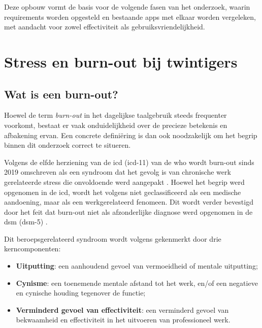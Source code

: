 \vspace{1em}

Deze opbouw vormt de basis voor de volgende fasen van het onderzoek, waarin requirements worden opgesteld en bestaande apps met elkaar worden vergeleken, met aandacht voor zowel effectiviteit als gebruiksvriendelijkheid.




\section{Stress en burn-out bij twintigers}
\label{sec:burnout-bij-twintigers}

\subsection{Wat is een burn-out?}
\label{subsec:wat-is-burnout}

\vspace{1em}

Hoewel de term \textit{burn-out} in het dagelijkse taalgebruik steeds frequenter voorkomt, bestaat er vaak onduidelijkheid over de precieze betekenis en afbakening ervan. Een concrete definiëring is dan ook noodzakelijk om het begrip binnen dit onderzoek correct te situeren.

\vspace{1em}

Volgens de elfde herziening van de \acrlong{icd} (\acrshort{icd}-11) van de \acrshort{who} wordt burn-out sinds 2019 omschreven als een syndroom dat het gevolg is van chronische werk gerelateerde stress die onvoldoende werd aangepakt \autocite{WHOW2019}. Hoewel het begrip werd opgenomen in de \acrshort{icd}, wordt het volgens \textcite{WHOW2019}niet geclassificeerd als een medische aandoening, maar als een werkgerelateerd fenomeen. Dit wordt verder bevestigd door het feit dat burn-out niet als afzonderlijke diagnose werd opgenomen in de \acrlong{dsm} (\acrshort{dsm}-5) \autocite{Association2013}.

\vspace{1em}

Dit beroepsgerelateerd syndroom wordt volgens \textcite{WHOW2019} gekenmerkt door drie kerncomponenten:
\begin{itemize}
    \item \textbf{Uitputting}: een aanhoudend gevoel van vermoeidheid of mentale uitputting;
    \item \textbf{Cynisme}: een toenemende mentale afstand tot het werk, en/of een negatieve en cynische houding tegenover de functie;
    \item \textbf{Verminderd gevoel van effectiviteit}: een verminderd gevoel van bekwaamheid en effectiviteit in het uitvoeren van professioneel werk.
\end{itemize}

